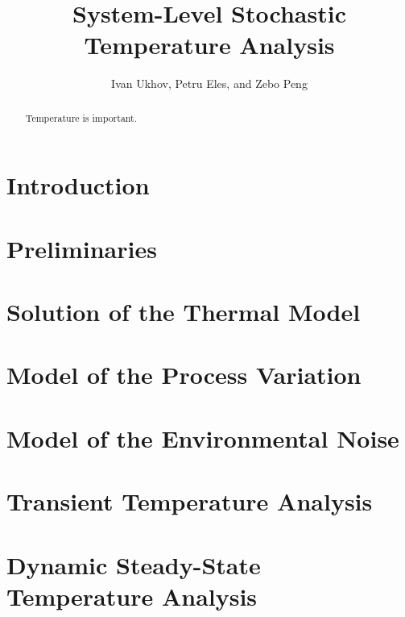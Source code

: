 \documentclass[conference]{IEEEtran}
\begin{document}
  \title{System-Level Stochastic Temperature Analysis}
  \author{Ivan Ukhov, Petru Eles, and Zebo Peng}

  \maketitle

  \begin{abstract}
    Temperature is important.
  \end{abstract}

  \section{Introduction}  
  

  \section{Preliminaries}
  

  \section{Solution of the Thermal Model} 
  

  \section{Model of the Process Variation} 
  

  \section{Model of the Environmental Noise} 
  


  \section{Transient Temperature Analysis} 
  

  \section{Dynamic Steady-State Temperature Analysis} 
  

  
  
\end{document}
